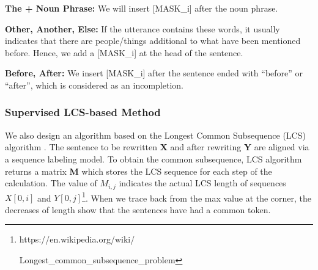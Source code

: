 \noindent
\textbf{The + Noun Phrase:}
We will insert [MASK\_i] after the noun phrase.

\noindent
\textbf{Other, Another, Else:}
If the utterance contains these words,
it usually indicates that
 there are people/things 
additional to what have been mentioned
before.
Hence,
we add a [MASK\_i] 
at the head of the sentence.

\noindent
\textbf{Before, After:}
We insert [MASK\_i] after the sentence 
ended with ``before'' or ``after'',
which is considered as an incompletion.





\subsubsection{Supervised LCS-based Method}
\label{sec:becky-lcs}
We also design an algorithm based on the Longest Common Subsequence (LCS)
algorithm
.
The sentence to be rewritten \textbf{X} and after rewriting \textbf{Y} are aligned via a sequence labeling model. To obtain the common subsequence, LCS algorithm returns a matrix \textbf{M} which stores the LCS sequence for each step of the calculation. The value of $M_{i,j}$ indicates the actual LCS length of sequences $X[0,i]$ and $Y[0,j]$\footnote{https://en.wikipedia.org/wiki/

Longest\_common\_subsequence\_problem}. 
When we trace back from the max value at the corner, the decreases of length show that the sentences have had a common token.

